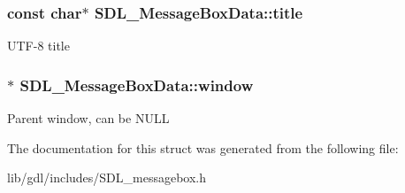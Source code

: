 \subsubsection[{title}]{\setlength{\rightskip}{0pt plus 5cm}const char$\ast$ S\+D\+L\+\_\+\+Message\+Box\+Data\+::title}\label{struct_s_d_l___message_box_data_a93ceeafeed20b553ad4c86c9be37f117}
U\+T\+F-\/8 title \hypertarget{struct_s_d_l___message_box_data_a5c333bc93705c66068e140bc28daedcb}{}
\subsubsection[{window}]{$\ast$ S\+D\+L\+\_\+\+Message\+Box\+Data\+::window}\label{struct_s_d_l___message_box_data_a5c333bc93705c66068e140bc28daedcb}
Parent window, can be N\+U\+L\+L 

The documentation for this struct was generated from the following file\+:\begin{DoxyCompactItemize}
\item 
lib/gdl/includes/S\+D\+L\+\_\+messagebox.\+h\end{DoxyCompactItemize}
